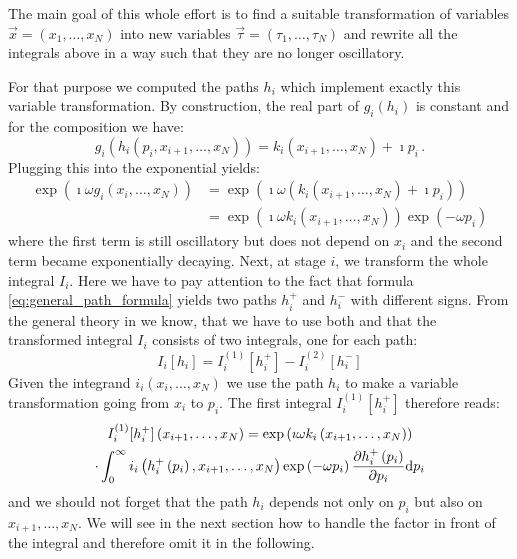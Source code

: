\documentclass[a4paper,10pt]{article}
\begin{document}
The main goal of this whole effort is to find a suitable transformation of
variables $\vec{x} = \left(x_1,\ldots,x_N\right)$ into new
variables $\vec{\tau} = \left(\tau_1,\ldots,\tau_N\right)$ and
rewrite all the integrals above in a way such that they are no longer
oscillatory.

For that purpose we computed the paths $h_i$ which implement exactly
this variable transformation. By construction, the real part of
$g_i\left(h_i\right)$ is constant and for the composition we have:
\begin{equation}
  g_i\left(h_i\left(p_i, x_{i+1},\ldots,x_N\right)\right)
  = k_i\left(x_{i+1},\ldots,x_N\right)
  + \imath p_i \,.
\end{equation}
Plugging this into the exponential yields:
\begin{equation}
\begin{split}
  \exp\left(\imath \omega g_i\left(x_i,\ldots,x_N\right)\right)
  & = \exp\left(\imath \omega \left(k_i\left(x_{i+1},\ldots,x_N\right) + \imath p_i\right)\right) \\
  & = \exp\left(\imath \omega k_i\left(x_{i+1},\ldots,x_N\right)\right)
      \exp\left(- \omega p_i\right)
\end{split}
\end{equation}
where the first term is still oscillatory but does not depend on $x_i$
and the second term became exponentially decaying. Next, at stage $i$, we
transform the whole integral $I_i$. Here we have to pay attention to the
fact that formula \eqref{eq:general_path_formula} yields two paths $h_i^{+}$
and $h_i^{-}$ with different signs. From the general theory in \cite{AH_cgq}
we know, that we have to use both and that the transformed integral $I_i$
consists of two integrals, one for each path:
\begin{equation}
  I_i[h_i] = I_i^{(1)}[h_i^{+}] - I_i^{(2)}[h_i^{-}]
\end{equation}
Given the integrand $i_i(x_i, \ldots, x_N)$ we use the path $h_i$
to make a variable transformation going from $x_i$ to $p_i$. The first
integral $I_i^{(1)}[h_i^{+}]$ therefore reads:
\begin{multline}
  I_i^{(1)}[h_i^{+}]\left(x_{i+1},\ldots,x_N\right) =
  \exp\left(\imath \omega k_i\left(x_{i+1},\ldots,x_N\right)\right)
  \\
  \cdot
  \int_0^\infty
    i_i\left(h_i^{+}\left(p_i\right), x_{i+1},\ldots,x_N\right)
    \exp\left(- \omega p_i\right)
    \frac{\partial h_i^{+}\left(p_i\right)}{\partial p_i}
  \mathrm{d}p_i
\end{multline}
and we should not forget that the path $h_i$ depends not only
on $p_i$ but also on $x_{i+1},\ldots,x_N$. We will see in the
next section how to handle the factor in front of the integral
and therefore omit it in the following.
\end{document}
